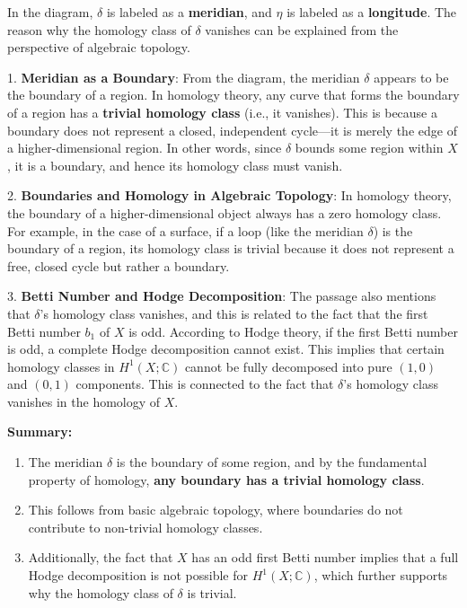 \documentclass[lang=en,12pt,twoside]{textbook}
\begin{document}
\begin{remark}
    \upshape
    In the diagram, $\delta$ is labeled as a \textbf{meridian}, and $\eta$ is labeled as a \textbf{longitude}. The reason why the homology class of $\delta$ vanishes can be explained from the perspective of algebraic topology.

1. \textbf{Meridian as a Boundary}:
   From the diagram, the meridian $\delta$ appears to be the boundary of a region. In homology theory, any curve that forms the boundary of a region has a \textbf{trivial homology class} (i.e., it vanishes). This is because a boundary does not represent a closed, independent cycle—it is merely the edge of a higher-dimensional region. In other words, since $\delta$ bounds some region within $X$, it is a boundary, and hence its homology class must vanish.

2. \textbf{Boundaries and Homology in Algebraic Topology}:
   In homology theory, the boundary of a higher-dimensional object always has a zero homology class. For example, in the case of a surface, if a loop (like the meridian $\delta$) is the boundary of a region, its homology class is trivial because it does not represent a free, closed cycle but rather a boundary.

3. \textbf{Betti Number and Hodge Decomposition}:
   The passage also mentions that $\delta$'s homology class vanishes, and this is related to the fact that the first Betti number $b_1$ of $X$ is odd. According to Hodge theory, if the first Betti number is odd, a complete Hodge decomposition cannot exist. This implies that certain homology classes in $H^1(X;\mathbb{C})$ cannot be fully decomposed into pure $(1,0)$ and $(0,1)$ components. This is connected to the fact that $\delta$'s homology class vanishes in the homology of $X$.

\textbf{Summary:}\begin{enumerate}
\item The meridian $\delta$ is the boundary of some region, and by the fundamental property of homology, \textbf{any boundary has a trivial homology class}.
\item This follows from basic algebraic topology, where boundaries do not contribute to non-trivial homology classes.
\item Additionally, the fact that $X$ has an odd first Betti number implies that a full Hodge decomposition is not possible for $H^1(X;\mathbb{C})$, which further supports why the homology class of $\delta$ is trivial.
\end{enumerate}
\end{remark}
\end{document}
